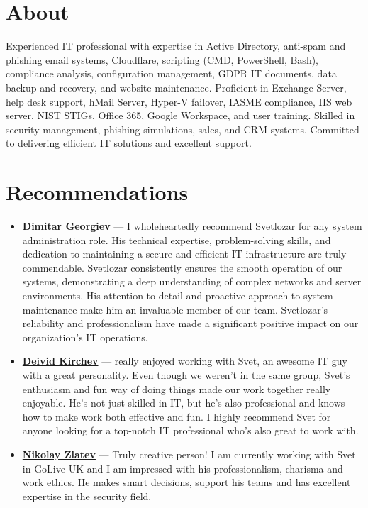 \documentclass[letterpaper, 10pt]{article}
\begin{document}
	\newpage
	
	\section*{About}
	Experienced IT professional with expertise in Active Directory, anti-spam and
	phishing email systems, Cloudflare, scripting (CMD, PowerShell, Bash), compliance
	analysis, configuration management, GDPR IT documents, data backup and
	recovery, and website maintenance. Proficient in Exchange Server, help desk support,
	hMail Server, Hyper-V failover, IASME compliance, IIS web server, NIST STIGs, Office
	365, Google Workspace, and user training. Skilled in security management, phishing
	simulations, sales, and CRM systems. Committed to delivering efficient IT
	solutions and excellent support.
	
	\section*{Recommendations}
	\begin{itemize}
		\item \textbf{\href{https://www.linkedin.com/in/dimitar-georgiev-29a6ab144/}{Dimitar
				Georgiev}} — I wholeheartedly recommend Svetlozar for any system
		administration role. His technical expertise, problem-solving skills, and dedication
		to maintaining a secure and efficient IT infrastructure are truly commendable.
		Svetlozar consistently ensures the smooth operation of our systems, demonstrating
		a deep understanding of complex networks and server environments. His
		attention to detail and proactive approach to system maintenance make him
		an invaluable member of our team. Svetlozar’s reliability and professionalism
		have made a significant positive impact on our organization’s IT operations.\\
		
		\item \textbf{\href{https://www.linkedin.com/in/deivid-kirchev-00378b252/}{Deivid
				Kirchev}} — really enjoyed working with Svet, an awesome IT guy with a great
		personality. Even though we weren’t in the same group, Svet’s enthusiasm and
		fun way of doing things made our work together really enjoyable. He’s not
		just skilled in IT, but he’s also professional and knows how to make work both
		effective and fun. I highly recommend Svet for anyone looking for a top-notch
		IT professional who’s also great to work with.\\
		
		\item \textbf{\href{https://www.linkedin.com/in/nikolay-zlatev/}{Nikolay
				Zlatev}} — Truly creative person! I am currently working with Svet in GoLive
		UK and I am impressed with his professionalism, charisma and work ethics. He
		makes smart decisions, support his teams and has excellent expertise in
		the security field.
	\end{itemize}
\end{document}

